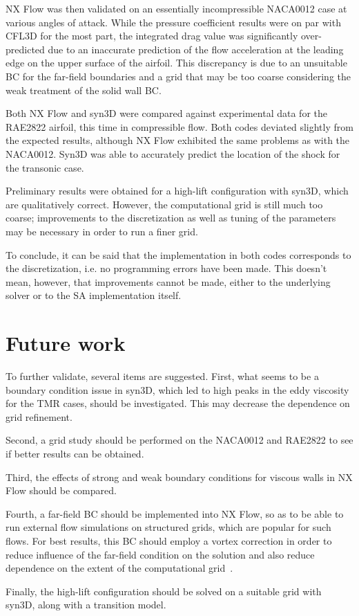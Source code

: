 NX Flow was then validated on an essentially incompressible NACA0012 case at various angles of attack. While the pressure coefficient results were on par with CFL3D for the most part, the integrated drag value was significantly over-predicted due to an inaccurate prediction of the flow acceleration at the leading edge on the upper surface of the airfoil. This discrepancy is due to an unsuitable BC for the far-field boundaries and a grid that may be too coarse considering the weak treatment of the solid wall BC.

Both NX Flow and syn3D were compared against experimental data for the RAE2822 airfoil, this time in compressible flow. Both codes deviated slightly from the expected results, although NX Flow exhibited the same problems as with the NACA0012. Syn3D was able to accurately predict the location of the shock for the transonic case.

Preliminary results were obtained for a high-lift configuration with syn3D, which are qualitatively correct. However, the computational grid is still much too coarse; improvements to the discretization as well as tuning of the parameters may be necessary in order to run a finer grid.

To conclude, it can be said that the implementation in both codes corresponds to the discretization, i.e. no programming errors have been made. This doesn't mean, however, that improvements cannot be made, either to the underlying solver or to the SA implementation itself.

\section{Future work}
\label{sec:future}
To further validate, several items are suggested.
First, what seems to be a boundary condition issue in syn3D, which led to high peaks in the eddy viscosity for the TMR cases, should be investigated. This may decrease the dependence on grid refinement.

Second, a grid study should be performed on the NACA0012 and RAE2822 to see if better results can be obtained.

Third, the effects of strong and weak boundary conditions for viscous walls in NX Flow should be compared.

Fourth, a far-field BC should be implemented into NX Flow, so as to be able to run external flow simulations on structured grids, which are popular for such flows. For best results, this BC should employ a vortex correction in order to reduce influence of the far-field condition on the solution and also reduce dependence on the extent of the computational grid~\cite{tmrvortex,thomas1986far}.

Finally, the high-lift configuration should be solved on a suitable grid with syn3D, along with a transition model.
